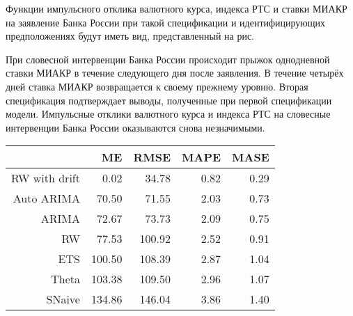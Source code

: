 \documentclass[12pt,a4paper, oneside]{extreport}
\begin{document}
Функции импульсного отклика валютного курса, индекса РТС и ставки МИАКР на заявление Банка России при такой спецификации и идентифицирующих предположениях будут иметь вид, представленный на рис.%


При словесной интервенции Банка России происходит прыжок однодневной ставки МИАКР в течение следующего дня после заявления. В течение четырёх дней ставка МИАКР возвращается к своему прежнему уровню. Вторая спецификация подтверждает выводы, полученные при первой спецификации модели. Импульсные отклики валютного курса и индекса РТС на словесные интервенции Банка России оказываются снова незначимыми.


\begin{table}[ht]
	\centering
	\begin{tabular}{rrrrr}
		\hline
		& ME & RMSE & MAPE & MASE \\ 
		\hline
		RW with drift  & 0.02 & 34.78 & 0.82 & 0.29 \\ 
		Auto ARIMA & 70.50 & 71.55 & 2.03 & 0.73 \\ 
		ARIMA & 72.67 & 73.73 & 2.09 & 0.75 \\ 
		RW & 77.53 & 100.92 & 2.52 & 0.91 \\ 
		ETS & 100.50 & 108.39 & 2.87 & 1.04 \\ 
		Theta & 103.38 & 109.50 & 2.96 & 1.07 \\ 
		SNaive & 134.86 & 146.04 & 3.86 & 1.40 \\ 
		\hline
	\end{tabular}
\end{table}
\end{document}
